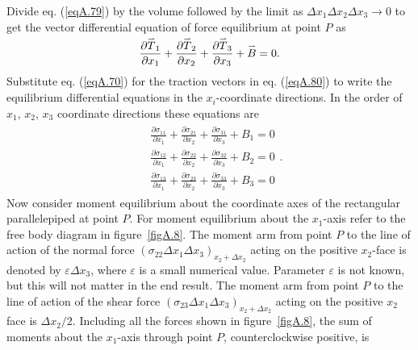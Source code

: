 \documentclass{AeroStructure-ERJohnson}
\def\harp#1{\smash{\mathord{\buildrel{\lower3pt\hbox{$\scriptscriptstyle\rightharpoonup$}}\over{#1}}}}
\begin{document}
Divide eq. (\ref{eqA.79}) by the volume followed by the limit as $\Delta x_{1} \Delta x_{2} \Delta x_{3} \rightarrow 0$ to get the vector differential equation of force equilibrium at point $P$ as
\begin{align}\label{eqA.80}
\frac{\partial \harp{T}_{1}}{\partial x_{1}}+\frac{\partial \harp{T}_{2}}{\partial x_{2}}+\frac{\partial \harp{T}_{3}}{\partial x_{3}}+\harp{B}=0.
\end{align}
Substitute eq. (\ref{eqA.70}) for the traction vectors in eq. (\ref{eqA.80}) to write the equilibrium differential equations in the $x_{i}$-coordinate directions. In the order of $x_{1}$, $x_{2}$, $x_{3}$ coordinate directions these equations are
\begin{align}\label{eqA.81}	
\begin{aligned}
&\frac{\partial \sigma_{11}}{\partial x_{1}}+\frac{\partial \sigma_{21}}{\partial x_{2}}+\frac{\partial \sigma_{31}}{\partial x_{3}}+B_{1}=0\\ &\frac{\partial \sigma_{12}}{\partial x_{1}}+\frac{\partial \sigma_{22}}{\partial x_{2}}+\frac{\partial \sigma_{32}}{\partial x_{3}}+B_{2}=0\\ &\frac{\partial \sigma_{13}}{\partial x_{1}}+\frac{\partial \sigma_{23}}{\partial x_{2}}+\frac{\partial \sigma_{33}}{\partial x_{3}}+B_{3}=0\end{aligned}.
\end{align}\noindent Now consider moment equilibrium about the coordinate axes of the rectangular parallelepiped at point $P$. For moment equilibrium about the $x_{1}$-axis refer to the free body diagram in figure~\ref{figA.8}.  The moment arm from point $P$ to the line of action of the normal force $(\sigma_{22} \Delta x_{1} \Delta x_{3})_{x_{2}+\Delta x_{2}}$ acting on the positive $x_{2}$-face is denoted by $\varepsilon \Delta x_{3}$, where $\varepsilon$ is a small numerical value. Parameter $\varepsilon$ is not known, but this will not matter in the end result. The moment arm from point $P$ to the line of action of the shear force $(\sigma_{23} \Delta x_{1} \Delta x_{3})_{x_{2}+\Delta x_{2}}$ acting on the positive $x_{2}$ face is $\Delta x_{2} / 2$. Including all the forces shown in figure~\ref{figA.8}, the sum of moments about the $x_{1}$-axis through point $P$, counterclockwise positive, is
\end{document}
